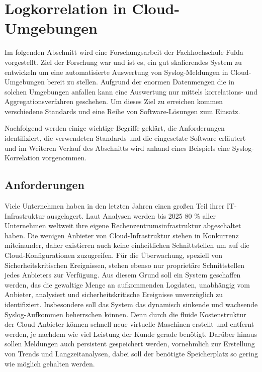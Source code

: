 \chapter{Logkorrelation in Cloud-Umgebungen}\label{02_jcorrelat}
\thispagestyle{fancy}

Im folgenden Abschnitt wird eine Forschungsarbeit der Fachhochschule Fulda 
\cite{reissmann} vorgestellt. Ziel der Forschung war und ist es, ein gut skalierendes 
System zu entwickeln um eine automatisierte Auswertung von Syslog-Meldungen in 
Cloud-Umgebungen bereit zu stellen. Aufgrund der enormen Datenmengen die in solchen 
Umgebungen anfallen kann eine Auswertung nur mittels korrelations- und 
Aggregationsverfahren geschehen. Um dieses Ziel zu erreichen kommen verschiedene 
Standards und eine Reihe von Software-Lösungen zum Einsatz.

Nachfolgend werden einige wichtige Begriffe geklärt, die Anforderungen identifiziert, die 
verwendeten Standards und die eingesetzte Software erläutert und im Weiteren Verlauf des 
Abschnitts wird anhand eines Beispiels eine Syslog-Korrelation vorgenommen.

\section{Anforderungen}\label{anforderungen}

Viele Unternehmen haben in den letzten Jahren einen großen Teil ihrer IT-Infrastruktur 
ausgelagert. Laut Analysen werden bis 2025 80 \% aller Unternehmen \cite{web_ix} 
weltweit ihre eigene Rechenzentrumsinfrastruktur abgeschaltet haben. Die wenigen Anbieter 
von Cloud-Infrastruktur stehen in Konkurrenz miteinander, daher existieren auch keine 
einheitlichen Schnittstellen um auf die Cloud-Konfigurationen zuzugreifen. Für die 
Überwachung, speziell von Sicherheitskritischen Ereignissen, stehen ebenso nur 
proprietäre Schnittstellen jedes Anbieters zur Verfügung. Aus diesem Grund soll ein 
System geschaffen werden, das die gewaltige Menge an aufkommenden Logdaten, unabhängig 
vom Anbieter, analysiert und sicherheitskritische Ereignisse unverzüglich zu 
identifiziert. Insbesondere soll das System das dynamisch sinkende und wachsende 
Syslog-Aufkommen beherrschen können. Denn durch die fluide Kostenstruktur der 
Cloud-Anbieter können schnell neue virtuelle Maschinen erstellt und entfernt werden, je 
nachdem wie viel Leistung der Kunde gerade benötigt.
Darüber hinaus sollen Meldungen auch persistent gespeichert werden, vornehmlich zur 
Erstellung von Trends und Langzeitanalysen, dabei soll der benötigte Speicherplatz so 
gering wie möglich gehalten werden.

